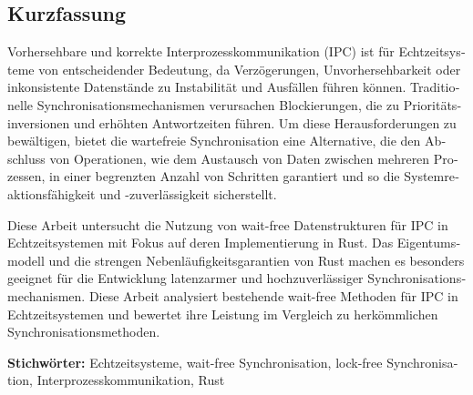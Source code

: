 \cleardoublepage

\begin{otherlanguage}{ngerman}
\chapter*{Kurzfassung}


Vorhersehbare und korrekte Interprozesskommunikation (IPC) ist für Echtzeitsysteme von entscheidender Bedeutung, da Verzögerungen, Unvorhersehbarkeit oder inkonsistente Datenstände zu Instabilität und Ausfällen führen können. Traditionelle Synchronisationsmechanismen verursachen Blockierungen, die zu Prioritätsinversionen und erhöhten Antwortzeiten führen. Um diese Herausforderungen zu bewältigen, bietet die wartefreie Synchronisation eine Alternative, die den Abschluss von Operationen, wie dem Austausch von Daten zwischen mehreren Prozessen, in einer begrenzten Anzahl von Schritten garantiert und so die Systemreaktionsfähigkeit und -zuverlässigkeit sicherstellt.

Diese Arbeit untersucht die Nutzung von wait-free Datenstrukturen für IPC in Echtzeitsystemen mit Fokus auf deren Implementierung in Rust. Das Eigentumsmodell und die strengen Nebenläufigkeitsgarantien von Rust machen es besonders geeignet für die Entwicklung latenzarmer und hochzuverlässiger Synchronisationsmechanismen. Diese Arbeit analysiert bestehende wait-free Methoden für IPC in Echtzeitsystemen und bewertet ihre Leistung im Vergleich zu herkömmlichen Synchronisationsmethoden.

\vfill
\noindent\textbf{Stichwörter:} Echtzeitsysteme, wait-free Synchronisation, lock-free Synchronisation, Interprozesskommunikation, Rust
\vfill
\end{otherlanguage}

